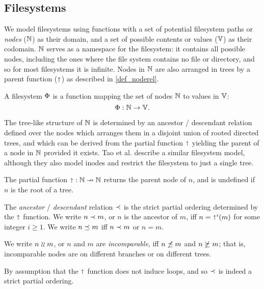 
\subsection{Filesystems}

We model filesystems using functions with a set of potential filesystem paths or \emph{nodes} ($\mathbb{N}$) as their domain,
and a set of possible contents or values ($\mathbb{V}$) as their codomain.
$\mathbb{N}$  serves as a namespace for the filesystem:
it contains all possible nodes, including the ones 
where the file system contains no file or directory,
and so for most filesystems it is infinite.
Nodes in $\mathbb{N}$ are also arranged in trees by a parent function ($\mathord{\shortuparrow}$) as described in \cref{def_noderel}.

\begin{mydef}[Filesystems, $\FS$]
A filesystem $\FS$ is a function
mapping the set of nodes $\mathbb{N}$ to values in $\mathbb{V}$:
\[ \Phi: \mathbb{N} \rightarrow \mathbb{V}. \]
\end{mydef}


The tree-like structure of $\mathbb{N}$ is determined by
an ancestor / descendant relation defined over the nodes
which arranges them in a disjoint union of rooted directed trees,
and which can be derived from the partial function $\mathord{\shortuparrow}$ yielding
the parent of a node in $\mathbb{N}$ provided it exists.
Tao et al. \cite{TSR} describe a similar filesystem model, although
they also model inodes and restrict the filesystem to just a single tree.

\begin{mydef}
The partial function $\mathord{\shortuparrow}:\mathbb{N}\nrightarrow\mathbb{N}$
returns the parent node of $n$,
and is undefined if $n$ is the root of a tree.

The \emph{ancestor} / \emph{descendant} relation $\prec$ is the
strict partial ordering determined by the $\mathord{\shortuparrow}$ function.
We write $n\prec m$, or $n$ is the ancestor of $m$,
iff $n=\mathord{\shortuparrow}^i(m)$ for some integer $i\ge 1$.
We write $n\preceq m$ iff $n\prec m$ or $n=m$.

We write $n\mathrel{\wr\wr} m$, or $n$ and $m$ are \emph{incomparable},
iff $n\not\preceq m$ and $n\not\succeq m$;
that is, incomparable nodes are on different branches or on different trees.
\end{mydef}
By assumption that the $\mathord{\shortuparrow}$ function does not induce loops, and so
$\prec$ is indeed a strict partial ordering.

